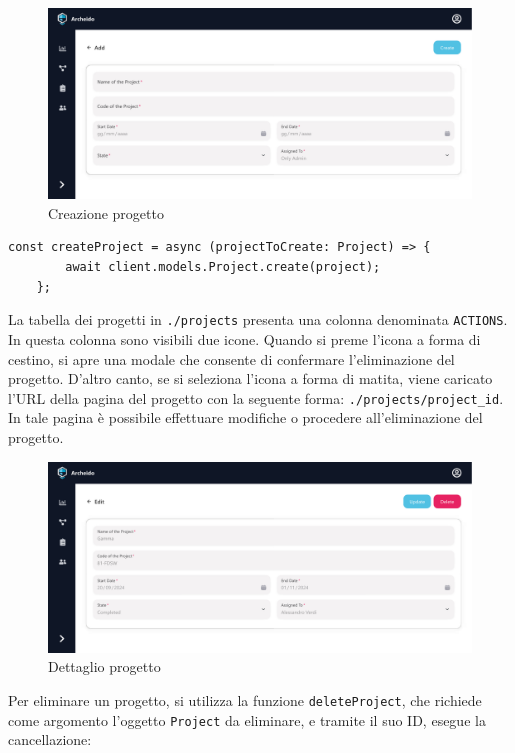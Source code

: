 \documentclass[target=bach,aauheader=,style=]{thud}
\begin{document}
\begin{figure}[htbp]
    \centering
    \includegraphics[width=1\textwidth]{img/interfacce/table_add.pdf} 
    \caption{Creazione progetto}
\end{figure}

\begin{lstlisting}[caption=funzione \texttt{createProject}]
    const createProject = async (projectToCreate: Project) => {
        await client.models.Project.create(project);
    };
\end{lstlisting}

La tabella dei progetti in \texttt{./projects} presenta una colonna denominata \texttt{ACTIONS}. In questa colonna sono visibili due icone. Quando si preme l'icona a forma di cestino, si apre una modale che consente di confermare l'eliminazione del progetto. D'altro canto, se si seleziona l'icona a forma di matita, viene caricato l'URL della pagina del progetto con la seguente forma: \texttt{./projects/project\_id}. In tale pagina è possibile effettuare modifiche o procedere all'eliminazione del progetto.
\begin{figure}[htbp]
    \centering
    \includegraphics[width=1\textwidth]{img/interfacce/table_edit.pdf} 
    \caption{Dettaglio progetto}
\end{figure}


Per eliminare un progetto, si utilizza la funzione \texttt{deleteProject}, che richiede come argomento l'oggetto \texttt{Project} da eliminare, e tramite il suo ID, esegue la cancellazione:
\end{document}
